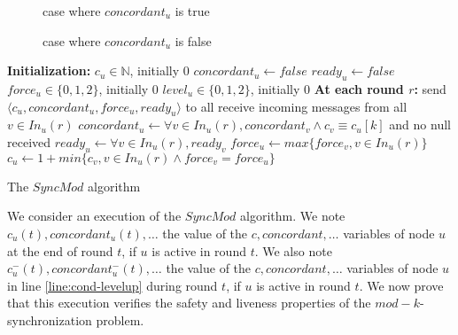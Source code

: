 \documentclass[11pt,letterpaper]{article}
\begin{document}
\begin{figure}[h]
    \centering
    \def\svgwidth{0.8\columnwidth}
	
	\caption{case where $concordant_u$ is true}
	\label{fig:fig1}
\end{figure}

\begin{figure}[h]
    \centering
    \def\svgwidth{0.8\columnwidth}
	
	\caption{case where $concordant_u$ is false}
	\label{fig:fig2}
\end{figure}


\begin{algorithm}[htb]
	\DontPrintSemicolon
	\textbf{Initialization:} \;
	\Indp
		$c_u \in \mathds{N}$, initially 0 \;
		$concordant_u \leftarrow false$ \;
		$ready_u \leftarrow false$ \;
		$force_u \in \{0, 1, 2\}$, initially 0 \;
		$level_u \in \{0, 1, 2\}$, initially 0 \;
	\BlankLine
	\Indm
	\textbf{At each round $r$:} \;
	\Indp
		send $\langle c_u, concordant_u, force_u, ready_u \rangle$ to all  \;
		receive incoming messages from all $v \in In_u(r)$ \;
		$concordant_u \leftarrow \forall v \in In_u(r), concordant_v \wedge c_v \equiv c_u [k]$ and no null received \; \label{line:conc-gossip}
		$ready_u \leftarrow \forall v \in In_u(r), ready_v$ \; \label{line:ready-gossip} 
		$force_u \leftarrow max \{force_v, v \in In_u(r) \}$ \;\label{line:force}
		$c_u \leftarrow 1+ min \{c_v, v \in In_u(r) \wedge force_v = force_u\}$ \;\label{line:min-z-end} 
	\Indm
\caption{The $SyncMod$ algorithm} 
\end{algorithm}

We consider an execution of the $SyncMod$ algorithm.
We note $c_u(t), concordant_u(t), \dots$ the value of the $c, concordant, \dots$ variables of node $u$ at the end of round $t$, if $u$ is active in round $t$.
We also note $c^{-}_u(t), concordant^{-}_u(t), \dots$ the value of the $c, concordant, \dots$ variables
of node $u$ in line \ref{line:cond-levelup} during round $t$, if $u$ is active in round $t$.
We now prove that this execution verifies the safety and liveness properties of the $mod-k$-synchronization problem.
\end{document}
